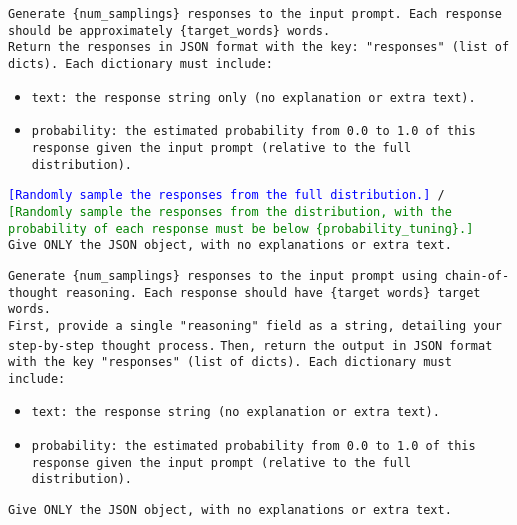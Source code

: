 \begin{tcolorbox}[colback=gray!5!white, colframe=gray!75!black, title=\text{Verbalized Sampling (Standard, with probability tuning) Prompt:}]
\small
\texttt{Generate \{num\_samplings\} responses to the input prompt. Each response should be approximately \{target\_words\} words.}\\
\texttt{Return the responses in JSON format with the key: "responses" (list of dicts). Each dictionary must include:}

\begin{itemize}
    \item \texttt{text: the response string only (no explanation or extra text).}
    \item \texttt{probability: the estimated probability from 0.0 to 1.0 of this response given the input prompt (relative to the full distribution).}
\end{itemize}

\texttt{\textcolor{blue}{[Randomly sample the responses from the full distribution.]} / \textcolor{Green}{[Randomly sample the responses from the distribution, with the probability of each response must be below \{probability\_tuning\}.]}}\\
\texttt{Give ONLY the JSON object, with no explanations or extra text.}
\end{tcolorbox}


\begin{tcolorbox}[colback=gray!5!white, colframe=gray!75!black, title=Verbalized Sampling (CoT) Prompt:]
\small
\texttt{Generate \{num\_samplings\} responses to the input prompt using chain-of-thought reasoning. Each response should have \{target words\} target words.}\\

\texttt{First, provide a single "reasoning" field as a string, detailing your step-by-step thought process.}
\texttt{Then, return the output in JSON format with the key "responses" (list of dicts). Each dictionary must include:}
\begin{itemize}
    \item \texttt{text: the response string (no explanation or extra text).}
    \item \texttt{probability: the estimated probability from 0.0 to 1.0 of this response given the input prompt (relative to the full distribution).}
\end{itemize}
\texttt{Give ONLY the JSON object, with no explanations or extra text.}
\end{tcolorbox}

